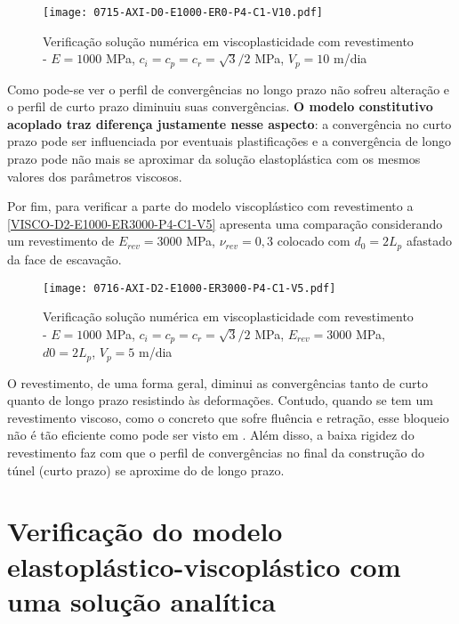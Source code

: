 \begin{figure}[H]
	\begin{center}
		\texttt{[image: 0715-AXI-D0-E1000-ER0-P4-C1-V10.pdf]}
	\end{center}
	\caption{\label{VISCO-D0-E1000-ER0-P4-C1-V10}Verificação solução numérica em viscoplasticidade com revestimento - $E = 1000$ MPa, $c_i=c_p=c_r=\sqrt{3}/2$ MPa, $V_p=10$ m/dia}
\end{figure}
Como pode-se ver o perfil de convergências no longo prazo não sofreu alteração e o perfil de curto prazo diminuiu suas convergências. \textbf{O modelo constitutivo acoplado traz diferença justamente nesse aspecto}: a convergência no curto prazo pode ser influenciada por eventuais plastificações e a convergência de longo prazo pode não mais se aproximar da solução elastoplástica com os mesmos valores dos parâmetros viscosos.

Por fim, para verificar a parte do modelo viscoplástico com revestimento a \autoref{VISCO-D2-E1000-ER3000-P4-C1-V5} apresenta uma comparação considerando um revestimento de $E_{rev}=3000$ MPa, $\nu_{rev}=0,3$ colocado com $d_0=2L_p$ afastado da face de escavação.

\begin{figure}[H]
	\begin{center}
		\texttt{[image: 0716-AXI-D2-E1000-ER3000-P4-C1-V5.pdf]}
	\end{center}
	\caption{\label{VISCO-D2-E1000-ER3000-P4-C1-V5}Verificação solução numérica em viscoplasticidade com revestimento - $E = 1000$ MPa, $c_i=c_p=c_r=\sqrt{3}/2$ MPa, $E_{rev} = 3000$ MPa, $d0=2L_p$, $V_p=5$ m/dia}
\end{figure}
O revestimento, de uma forma geral, diminui as convergências tanto de curto quanto de longo prazo resistindo às deformações. Contudo, quando se tem um revestimento viscoso, como o concreto que sofre fluência e retração, esse bloqueio não é tão eficiente como pode ser visto em . Além disso, a baixa rigidez do revestimento faz com que o perfil de convergências no final da construção do túnel (curto prazo) se aproxime do de longo prazo.

\section{Verificação do modelo elastoplástico-viscoplástico com uma solução analítica}

